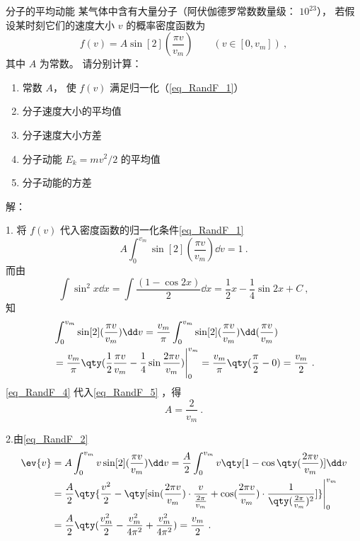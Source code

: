 \begin{example}{分子的平均动能}\label{ex_RandF_1}
某气体中含有大量分子（阿伏伽德罗常数数量级： $10^{23}$）， 若假设某时刻它们的速度大小 $v$ 的概率密度函数为
\begin{equation}
f(v) = A \sin[2](\frac{\pi v}{v_{m}}) \qquad (v \in [0, v_{m}])~,
\end{equation}
其中 $A$ 为常数。 请分别计算：
\begin{enumerate}
\item 常数 $A$， 使 $f(v)$ 满足归一化（\autoref{eq_RandF_1}）
\item 分子速度大小的平均值
\item 分子速度大小方差
\item 分子动能 $E_k = mv^2/2$ 的平均值
\item 分子动能的方差
\end{enumerate}

解：

1. 将 $f(v)$ 代入密度函数的归一化条件\autoref{eq_RandF_1} 
\begin{equation}\label{eq_RandF_5}
A\int_{0}^{v_{m}} \sin[2](\frac{\pi v}{v_{m}})\dd v= 1~.
\end{equation}
而由
\begin{equation}
\int \sin^2 x\dd x = \int\frac{(1-\cos 2x)}{2}\dd x = \frac{1}{2}x-\frac{1}{4}\sin 2x+C~,
\end{equation}
知
\begin{equation}\label{eq_RandF_4}
\begin{aligned}
&\int_{0}^{v_{m}} \sin[2](\frac{\pi v}{v_{m}})\dd v=\frac{v_{m}}{\pi}\int_{0}^{v_{m}} \sin[2](\frac{\pi v}{v_{m}})\dd (\frac{\pi v}{v_{m}})\\
&=\frac{v_{m}}{\pi}\qty (\frac{1}{2}\frac{\pi v}{v_{m}}-\frac{1}{4}\sin \frac{2\pi v}{v_{m}})\Bigg|_{0}^{v_{m}}=\frac{v_{m}}{\pi}\qty(\frac{\pi}{2}-0)=\frac{v_{m}}{2}~.
\end{aligned}
\end{equation}
\autoref{eq_RandF_4} 代入\autoref{eq_RandF_5} ，得 
\begin{equation}
A=\frac{2}{v_{m}}~.
\end{equation}

2.由\autoref{eq_RandF_2} 
\begin{equation}\label{eq_RandF_8}
\begin{aligned}
\ev{v}&=A\int_{0}^{v_{m}} v\sin[2](\frac{\pi v}{v_{m}})\dd v=\frac{A}{2}\int_0^{v_m}v\qty[1-\cos\qty(\frac{2\pi v}{v_{m}})]\dd v\\
&=\frac{A}{2}\qty{\frac{v^2}{2}-\qty[\sin(\frac{2\pi v}{v_{m}})\cdot\frac{v}{\frac{2\pi}{v_m}}+\cos(\frac{2\pi v}{v_{m}})\cdot\frac{1}{\qty(\frac{2\pi}{v_m})^2}]}\Bigg|_{0}^{v_{m}}\\
&=\frac{A}{2}\qty(\frac{v_{m}^2}{2}-\frac{v_{m}^2}{4\pi^2}+\frac{v_{m}^2}{4\pi^2})=\frac{v_{m}}{2}~.
\end{aligned}
\end{equation}


\end{example}
